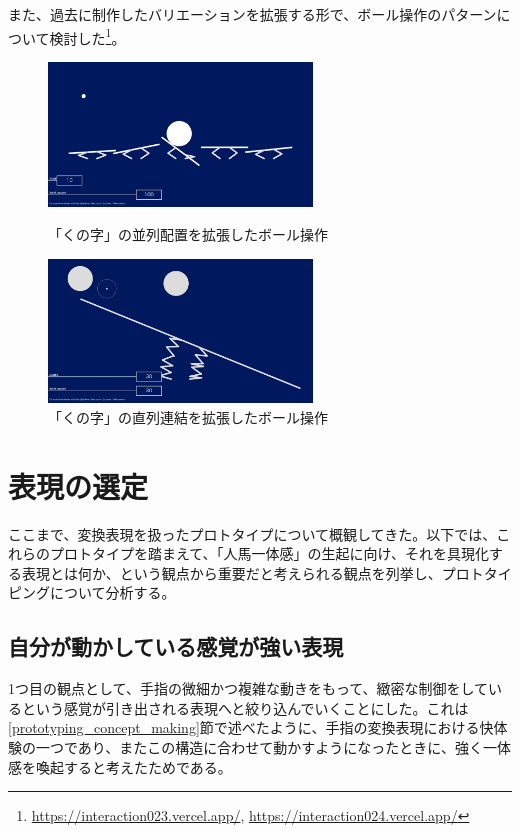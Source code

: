 また、過去に制作したバリエーションを拡張する形で、ボール操作のパターンについて検討した\footnote{\url{https://interaction023.vercel.app/}, \url{https://interaction024.vercel.app/}}。

\begin{figure}[htbp]
  \begin{minipage}[b]{0.5\linewidth}
    \centering
    \includegraphics[keepaspectratio, width=7cm]{img/ball_0.png}
    \caption{「くの字」の並列配置を拡張したボール操作}
    \label{fig:ball_0}
  \end{minipage}
  \begin{minipage}[b]{0.5\linewidth}
    \centering
    \includegraphics[keepaspectratio, width=7cm]{img/ball_1.png}
    \caption{「くの字」の直列連結を拡張したボール操作}
    \label{fig:ball_1}
  \end{minipage}
\end{figure}

\section{表現の選定}
ここまで、変換表現を扱ったプロトタイプについて概観してきた。以下では、これらのプロトタイプを踏まえて、「人馬一体感」の生起に向け、それを具現化する表現とは何か、という観点から重要だと考えられる観点を列挙し、プロトタイピングについて分析する。

\subsection{自分が動かしている感覚が強い表現}
1つ目の観点として、手指の微細かつ複雑な動きをもって、緻密な制御をしているという感覚が引き出される表現へと絞り込んでいくことにした。これは\ref{prototyping_concept_making}節で述べたように、手指の変換表現における快体験の一つであり、またこの構造に合わせて動かすようになったときに、強く一体感を喚起すると考えたためである。

